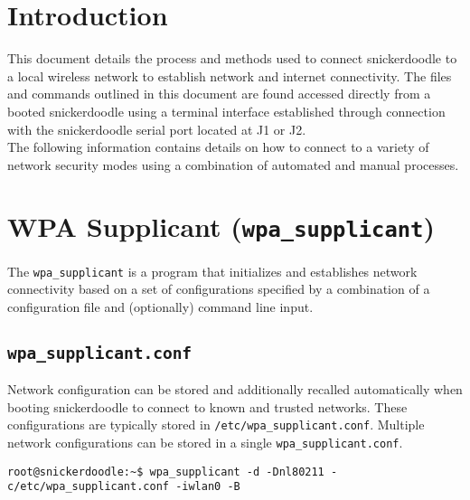 \section{Introduction}


This document details the process and methods used to connect snickerdoodle to a local wireless network to establish network and internet connectivity. The files and commands outlined in this document are found accessed directly from a booted snickerdoodle using a terminal interface established through connection with the snickerdoodle serial port located at J1 or J2. \\

\noindent
The following information contains details on how to connect to a variety of network security modes using a combination of automated and manual processes. 


\section{WPA Supplicant (\texttt{wpa\_supplicant})}
The \texttt{wpa\_supplicant} is a program that initializes and establishes network connectivity based on a set of configurations specified by a combination of a configuration file and (optionally) command line input. 


\subsection{\texttt{wpa\_supplicant.conf}}
Network configuration can be stored and additionally recalled automatically when booting snickerdoodle to connect to known and trusted networks. These configurations are typically stored in \texttt{/etc/wpa\_supplicant.conf}. Multiple network configurations can be stored in a single \texttt{wpa\_supplicant.conf}. \\

\begin{fullwidth}
\begin{lstlisting}[style=text]
root@snickerdoodle:~$ wpa_supplicant -d -Dnl80211 -c/etc/wpa_supplicant.conf -iwlan0 -B
\end{lstlisting}
\end{fullwidth}

